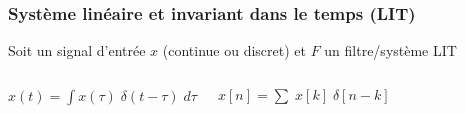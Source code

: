 \documentclass{beamer}
\begin{document}
\begin{frame} 
\frametitle{Système linéaire et invariant dans le temps (LIT) }
Soit un signal d'entrée $x$ (continue ou discret) et $F$ un filtre/système LIT\\
\vspace{1 cm}
\begin{columns}
\column{65mm}
\begin{center}
$x(t) = \displaystyle \int x(\tau)  \; \delta(t-\tau) \; d\tau$\\

\end{center}

\column{55mm}
\begin{center}
$x[n] =  \displaystyle \sum \; x[k] \; \delta[n-k] $ \\
\vspace{0.5cm}



\end{center}
\end{columns}
\end{frame}
\end{document}
